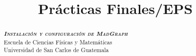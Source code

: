 \documentclass[osajnl,showpacs,superscriptaddress,10pt]{revtex4-2}
\begin{document}
\title{Prácticas Finales/EPS}
\begin{abstract}
    \begin{center}
        \vspace{300pt}
        \Large \textbf{\textit{\textsc{Instalación y configuración de MadGraph}}} \normalsize
        \vspace{300pt}
        \\
        \Large Escuela de Ciencias Físicas y Matemáticas \normalsize
        \\
        \large Universidad de San Carlos de Guatemala \normalsize
    \end{center}
\end{abstract}
\maketitle

\pagestyle{fancy}
\fancyhf{}
\fancyfoot[LE,RO]{\hfill\thepage\hfill}
\renewcommand{\footruleskip}{3pt}
\renewcommand{\footrulewidth}{1pt}

\newpage
\tableofcontents
\newpage





% 
% 

\end{document}
